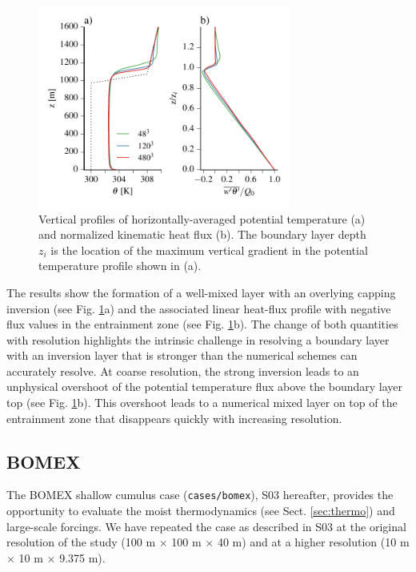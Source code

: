\documentclass[gmd,manuscript]{copernicus}
\begin{document}
\begin{figure}[t]
	\vspace*{2mm}
	\begin{center}
		\includegraphics[width=8.3cm]{figs/sullivan2011.pdf}
	\end{center}
	\caption{Vertical profiles of horizontally-averaged potential temperature (a) and normalized kinematic heat flux (b). The boundary layer depth $z_i$ is the location of the maximum vertical gradient in the potential temperature profile shown in (a). }
	\label{fig:sullivan2011}
\end{figure}

The results show the formation of a well-mixed layer with an overlying capping inversion (see Fig. \ref{fig:sullivan2011}a) and the associated linear heat-flux profile with negative flux values in the entrainment zone (see Fig. \ref{fig:sullivan2011}b). The change of both quantities with resolution highlights the intrinsic challenge in resolving a boundary layer with an inversion layer that is stronger than the numerical schemes can accurately resolve. At coarse resolution, the strong inversion leads to an unphysical overshoot of the potential temperature flux above the boundary layer top (see Fig. \ref{fig:sullivan2011}b). This overshoot leads to a numerical mixed layer on top of the entrainment zone  that disappears quickly with increasing resolution. %

\subsection{BOMEX}\label{sec:bomex}
The BOMEX shallow cumulus case \citep{Siebesma2003} (\texttt{cases/bomex}), S03 hereafter, provides the opportunity to evaluate the moist thermodynamics (see Sect. \ref{sec:thermo}) and large-scale forcings. We have repeated the case as described in S03 at the original resolution of the study (100 m $\times$ 100 m $\times$ 40 m) and at a higher resolution (10 m $\times$ 10 m $\times$ 9.375 m).
\end{document}
